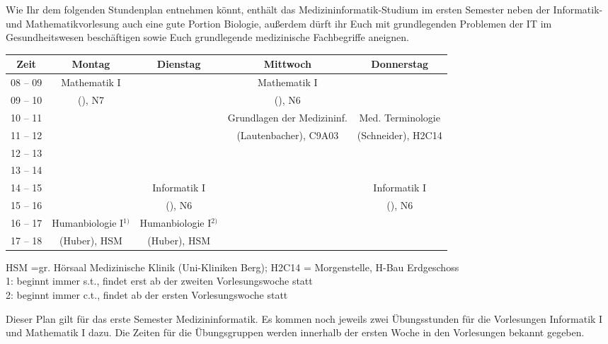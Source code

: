 Wie Ihr dem folgenden Stundenplan entnehmen könnt, enthält das Medizininformatik-Studium im ersten Semester neben der Informatik- und Mathematikvorlesung auch eine gute Portion Biologie, außerdem dürft ihr Euch mit grundlegenden Problemen der IT im Gesundheitswesen beschäftigen sowie Euch grundlegende medizinische Fachbegriffe aneignen.

\begin{center}
	\begin{tabular}{|c|c|c|c|c|} \hline
		Zeit      & 			Montag 		& Dienstag			& Mittwoch 						& Donnerstag 			 \\
		\hline\hline
		08 -- 09  & 		Mathematik I 	&  					& Mathematik I 					&  						\\
		\cline{1-1}\cline{3-3}\cline{5-5}			
		09 -- 10  & 		(\Matheprof), N7& 					& (\Matheprof), N6 				 &  						\\
		\hline
		10 -- 11  &							&					& Grundlagen der Medizininf.	& Med. Terminologie		\\
		\cline{1-3}
		11 -- 12  & 						&  					& (Lautenbacher), C9A03			&(Schneider), H2C14		\\
		\hline
		12 -- 13 & 							& 				 	& 				    			& 						 \\
		\hline
		13 -- 14 & 							& 					& 								& 						 \\
		\hline
		14 -- 15 & 							& Informatik I 		& 								& Informatik I 			\\
		\cline{1-2}\cline{4-4}
		15 -- 16 &							& (\Infoprof), N6 	& 								& (\Infoprof), N6 		\\
		\hline
		16 -- 17 & Humanbiologie I$^{1)}$	& Humanbiologie I$^{2)}$ & & \\
		\cline{1-1}\cline{4-5}
		17 -- 18 & (Huber), HSM				& (Huber), HSM		 & &  \\
		\hline
	\end{tabular}
\scriptsize	
HSM =gr. Hörsaal Medizinische Klinik (Uni-Kliniken Berg); H2C14 = Morgenstelle, H-Bau Erdgeschoss\\
1: beginnt immer s.t., findet erst ab der zweiten Vorlesungswoche statt\\
2: beginnt immer c.t., findet ab der ersten Vorlesungswoche statt\\
\end{center}
Dieser Plan gilt für das erste Semester Medizininformatik. Es kommen noch jeweils zwei Übungsstunden für die Vorlesungen 
Informatik I und Mathematik I dazu. Die Zeiten für die Übungsgruppen werden innerhalb der ersten Woche in den Vorlesungen bekannt gegeben.
